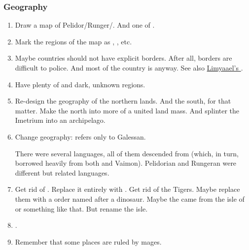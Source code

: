 \subsubsection{Geography}
\begin{enumerate}
 
  \item  
    Draw a map of Pelidor/Runger/\Scyrum. 
    And one of \Malcur. 
    
  \item  
    Mark the regions of the map as , , \quo{\wylde} etc.
    
  \item  
    Maybe countries should not have explicit borders. 
    After all, borders are difficult to police. 
    And most of the country is \wylde anyway. 
    See also \href{http://limyaael.insanejournal.com/373476.html}{Limyaael's }. 
    
  \item  
    Have plenty of  and dark, unknown regions. 
  
  \item  
    Re-design the geography of the northern lands. 
    And the south, for that matter.
    Make the north into more of a united land mass.
    And splinter the Imetrium into an archipelago.
  
  \item
    Change geography:
    \quo{\Velcad} refers only to Galessan.
    
    There were several \Velcadian languages, all of them descended from \Tepharin (which, in turn, borrowed heavily from both \Ortaican and Vaimon).
    Pelidorian and Rungeran were different but related languages.
  
  \item 
    Get rid of \GreatVelcad.
    Replace it entirely with \Tepharae.
    Get rid of the Tigers.
    Maybe replace them with a \Tepharin order named after a dinosaur.
    Maybe the \Tepharins came from the isle of \Velcad or something like that.
    But rename the isle.

  \item 
    .

  \item 
    Remember that some places are  ruled by mages. 
\end{enumerate}





